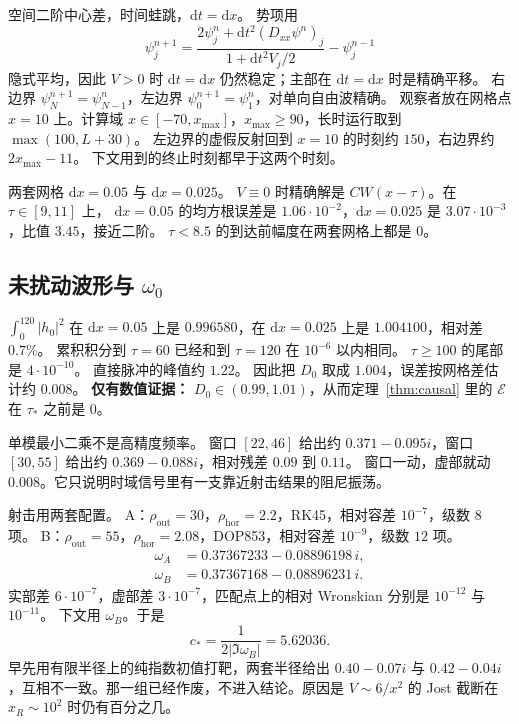 \documentclass[11pt]{ctexart}
\theoremstyle{definition}
\theoremstyle{remark}
\newcommand{\cE}{\mathcal E}
\newcommand{\dx}{\mathrm{d}x}
\newcommand{\dt}{\mathrm{d}t}
\begin{document}
空间二阶中心差，时间蛙跳，$\dt=\dx$。
势项用
\[
\psi^{n+1}_j=\frac{2\psi^n_j+\dt^2(D_{xx}\psi^n)_j}{1+\dt^2 V_j/2}-\psi^{n-1}_j
\]
隐式平均，因此 $V>0$ 时 $\dt=\dx$ 仍然稳定；主部在 $\dt=\dx$ 时是精确平移。
右边界 $\psi^{n+1}_N=\psi^n_{N-1}$，左边界 $\psi^{n+1}_0=\psi^n_1$，对单向自由波精确。
观察者放在网格点 $x=10$ 上。计算域 $x\in[-70,x_{\max}]$，$x_{\max}\ge90$，长时运行取到 $\max(100,L+30)$。
左边界的虚假反射回到 $x=10$ 的时刻约 $150$，右边界约 $2x_{\max}-11$。
下文用到的终止时刻都早于这两个时刻。

两套网格 $\dx=0.05$ 与 $\dx=0.025$。
$V\equiv0$ 时精确解是 $CW(x-\tau)$。在 $\tau\in[9,11]$ 上，
$\dx=0.05$ 的均方根误差是 $1.06\cdot10^{-2}$，$\dx=0.025$ 是 $3.07\cdot10^{-3}$，比值 $3.45$，接近二阶。
$\tau<8.5$ 的到达前幅度在两套网格上都是 $0$。

\subsection{未扰动波形与 $\omega_0$}

$\int_0^{120}|h_0|^2$ 在 $\dx=0.05$ 上是 $0.996580$，在 $\dx=0.025$ 上是 $1.004100$，相对差 $0.7\%$。
累积积分到 $\tau=60$ 已经和到 $\tau=120$ 在 $10^{-6}$ 以内相同。
$\tau\ge100$ 的尾部是 $4\cdot10^{-10}$。
直接脉冲的峰值约 $1.22$。
因此把 $D_0$ 取成 $1.004$，误差按网格差估计约 $0.008$。
\textbf{仅有数值证据：} $D_0\in(0.99,1.01)$，从而定理~\ref{thm:causal} 里的 $\cE$ 在 $\tau_*$ 之前是 $0$。

单模最小二乘不是高精度频率。
窗口 $[22,46]$ 给出约 $0.371-0.095i$，窗口 $[30,55]$ 给出约 $0.369-0.088i$，相对残差 $0.09$ 到 $0.11$。
窗口一动，虚部就动 $0.008$。它只说明时域信号里有一支靠近射击结果的阻尼振荡。

射击用两套配置。
A：$\rho_{\mathrm{out}}=30$，$\rho_{\mathrm{hor}}=2.2$，RK45，相对容差 $10^{-7}$，级数 $8$ 项。
B：$\rho_{\mathrm{out}}=55$，$\rho_{\mathrm{hor}}=2.08$，DOP853，相对容差 $10^{-9}$，级数 $12$ 项。
\[
\begin{aligned}
\omega_A&=0.37367233-0.08896198\,i,\\
\omega_B&=0.37367168-0.08896231\,i.
\end{aligned}
\]
实部差 $6\cdot10^{-7}$，虚部差 $3\cdot10^{-7}$，匹配点上的相对 Wronskian 分别是 $10^{-12}$ 与 $10^{-11}$。
下文用 $\omega_B$。于是
\[
c_*=\frac1{2|\Im\omega_B|}=5.62036.
\]
早先用有限半径上的纯指数初值打靶，两套半径给出 $0.40-0.07i$ 与 $0.42-0.04i$，互相不一致。那一组已经作废，不进入结论。原因是 $V\sim6/x^2$ 的 Jost 截断在 $x_R\sim10^2$ 时仍有百分之几。
\end{document}
